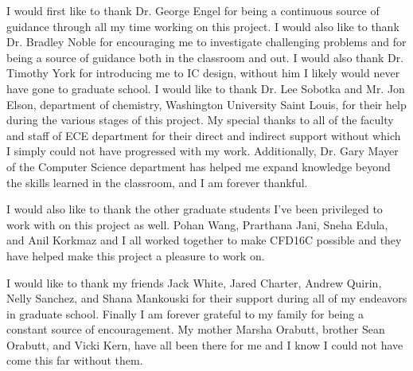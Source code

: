\documentclass[12pt,oneside,final]{siuethesis}
\theoremstyle{definition}
\begin{document}
\begin{acknowledgements} 

\par I would first like to thank Dr. George Engel for being a continuous source of guidance through all my time working on this project. I would also like to thank Dr. Bradley Noble for encouraging me to investigate challenging problems and for being a source of guidance both in the classroom and out. I would also thank Dr. Timothy York for introducing me to IC design, without him I likely would never have gone to graduate school. I  would  like  to thank  Dr.  Lee  Sobotka  and  Mr.  Jon  Elson,  department  of  chemistry, Washington  University  Saint  Louis,  for  their  help  during  the  various  stages  of  this  project. My  special  thanks  to all of the  faculty  and  staff  of  ECE  department  for  their  direct  and  indirect support without which I simply could not have progressed with my work. Additionally, Dr. Gary Mayer of the Computer Science department has helped me expand knowledge beyond the skills learned in the classroom, and I am forever thankful. 
\par I would also like to thank the other graduate students I've been privileged to work with on this project as well. Pohan Wang, Prarthana Jani, Sneha Edula, and Anil Korkmaz and I all worked together to make CFD16C possible and they have helped make this project a pleasure to work on.
\par I would like to thank my friends Jack White, Jared Charter, Andrew Quirin, Nelly Sanchez, and Shana Mankouski for their support during all of my endeavors in graduate school. Finally I am forever grateful to my family for being a constant source of encouragement. My mother Marsha Orabutt, brother Sean Orabutt, and Vicki Kern, have all been there for me and I know I could not have come this far without them.

\end{acknowledgements}

\tableofcontents

\cleardoublepage %

\cleardoublepage

\listoffigures %

\cleardoublepage

\listoftables

\mainmatter %

\end{document}
